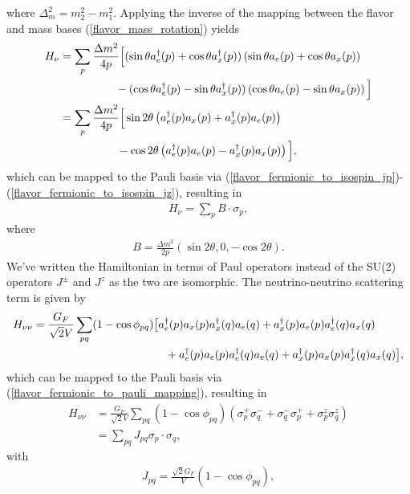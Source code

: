 \documentclass[10pt]{article}
\begin{document}
where $\Delta_m^2=m_2^2-m_1^2$. Applying the inverse of the mapping between the flavor and mass bases (\ref{flavor_mass_rotation}) yields
\begin{align}
H_\nu
&=
\sum_p\frac{\Delta m^2}{4p}\Big{[}
(\sin\theta a^\dagger_e(p)+\cos\theta a^\dagger_x(p))\left(\sin\theta a_e(p)+\cos\theta a_x(p)\right)
\nonumber
\\
&\hspace{17.5mm}-
(\cos\theta a^\dagger_e(p)-\sin\theta a^\dagger_x(p))\left(\cos\theta a_e(p)-\sin\theta a_x(p)\right)
\Big{]}
\\
&=
\sum_p\frac{\Delta m^2}{4p}\Big{[}
\sin2\theta\left(a^\dagger_e(p)a_x(p)+a^\dagger_x(p)a_e(p)\right)
\nonumber 
\\
&\hspace{18mm}-
\cos2\theta\left(a^\dagger_e(p)a_e(p)-a^\dagger_x(p)a_x(p)\right)
\Big{]}
,\end{align}
which can be mapped to the Pauli basis via (\ref{flavor_fermionic_to_isospin_jp})-(\ref{flavor_fermionic_to_isospin_jz}), resulting in
\begin{align}
\label{neutrino_neutrino_interaction}
H_\nu = \sum_p B\cdot \sigma_p
,\end{align}
where
\begin{align}
B=\frac{\Delta m^2}{2p}(\sin2\theta,0,-\cos2\theta).
\end{align}
We've written the Hamiltonian in terms of Paul operators instead of the SU(2) operators $J^\pm$ and $J^z$ as the two are isomorphic. The neutrino-neutrino scattering term is given by
\begin{align}
H_{\nu\nu}
&=
\frac{G_F}{\sqrt{2}V}\sum_{pq}(1-\cos\phi_{pq})
\big{[}
a^\dagger_e(p)a_x(p)a^\dagger_x(q)a_e(q)+a^\dagger_x(p)a_e(p)a^\dagger_e(q)a_x(q)
\nonumber
\\
&\hspace{41.5mm}+
a^\dagger_e(p)a_e(p)a^\dagger_e(q)a_e(q)+a^\dagger_x(p)a_x(p)a^\dagger_x(q)a_x(q)
\big{]}
,\end{align}
which can be mapped to the Pauli basis via (\ref{flavor_fermionic_to_pauli_mapping}), resulting in
\begin{align}
\label{neutrino_neutrino_term2}
H_{\nu\nu}
&=
\frac{G_F}{\sqrt{2}V}\sum_{pq}(1-\cos\phi_{pq})
\left(
\sigma^+_p\sigma^-_q+\sigma^-_q\sigma^+_p + \sigma^z_p\sigma^z_q
\right)
\nonumber
\\
&=
\sum_{pq}J_{pq}
\sigma_p\cdot\sigma_q
,\end{align}
with
\begin{align}
J_{pq}=\frac{\sqrt{2}G_F}{V}(1-\cos\phi_{pq})
,\end{align}
\end{document}

